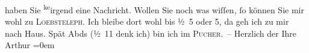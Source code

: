 \begin{ledgroupsized}[t]{13cm}
                    haben Sie \substVorne{}\textsuperscript{ke}\substDazwischen{}ir\substHinten{}gend eine Nachricht.\pend
           \pstart
           Wollen Sie noch was wiſſen, ſo können Sie mir wohl zu \textsc{Loebs}\textsc{teleph}. Ich
                    bleibe dort wohl bis ½ 5 oder 5, da{\geminationn} geh ich zu mir nach Haus. Spät Abds
                        (½ 11 denk ich) {\pb}bin ich im \textsc{Pucher}. –\pend
           \pstart
           Herzlich der Ihre{\\[\baselineskip]}\spacefill\mbox{Arthur}\pend
           \leftskip=0em{}
         
         \endnumbering{}\end{ledgroupsized}  \newcommand{\dateiname}{L00645}\newcommand{\titel}{Arthur Schnitzler an Hugo von Hofmannsthal, [9. 2. 1897?]}\newcommand{\editorInnen}{Martin Anton Müller und Gerd-Hermann Susen}
      